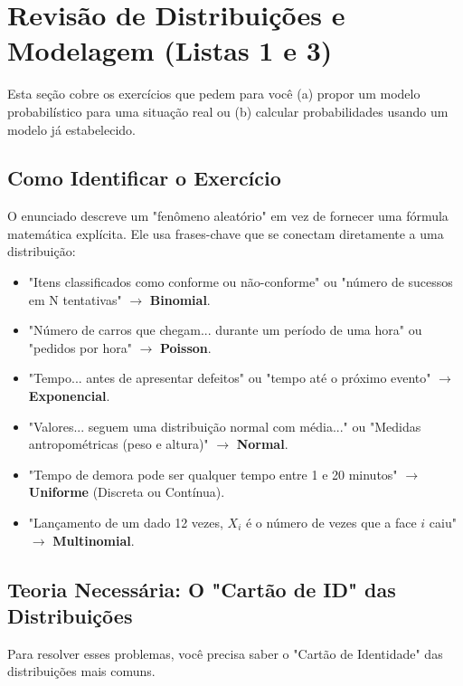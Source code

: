 
\section{Revisão de Distribuições e Modelagem (Listas 1 e 3)}
\label{sec:modelagem}

Esta seção cobre os exercícios que pedem para você (a) propor um modelo probabilístico para uma situação real ou (b) calcular probabilidades usando um modelo já estabelecido.

\subsection{Como Identificar o Exercício}
O enunciado descreve um "fenômeno aleatório" em vez de fornecer uma fórmula matemática explícita. Ele usa frases-chave que se conectam diretamente a uma distribuição:
\begin{itemize}
    \item "Itens classificados como conforme ou não-conforme" ou "número de sucessos em N tentativas" $\rightarrow$ \textbf{Binomial}.
    \item "Número de carros que chegam... durante um período de uma hora" ou "pedidos por hora" $\rightarrow$ \textbf{Poisson}.
    \item "Tempo... antes de apresentar defeitos" ou "tempo até o próximo evento" $\rightarrow$ \textbf{Exponencial}.
    \item "Valores... seguem uma distribuição normal com média..." ou "Medidas antropométricas (peso e altura)" $\rightarrow$ \textbf{Normal}.
    \item "Tempo de demora pode ser qualquer tempo entre 1 e 20 minutos" $\rightarrow$ \textbf{Uniforme} (Discreta ou Contínua).
    \item "Lançamento de um dado 12 vezes, $X_i$ é o número de vezes que a face $i$ caiu" $\rightarrow$ \textbf{Multinomial}.
\end{itemize}

\subsection{Teoria Necessária: O "Cartão de ID" das Distribuições}
Para resolver esses problemas, você precisa saber o "Cartão de Identidade" das distribuições mais comuns.

